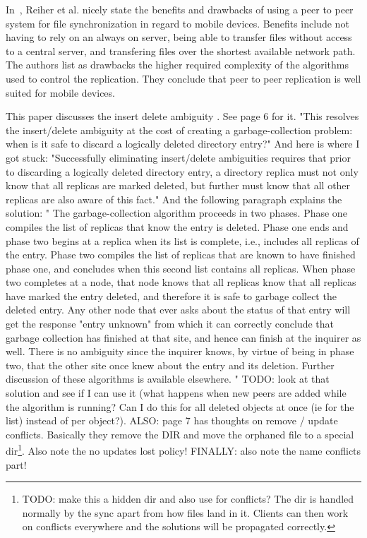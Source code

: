 In~\cite{reiher1996peer}, Reiher et al. nicely state the benefits and drawbacks of using a peer to peer system for file synchronization in regard to mobile devices.
Benefits include not having to rely on an always on server, being able to transfer files without access to a central server, and transfering files over the shortest available network path.
The authors list as drawbacks the higher required complexity of the algorithms used to control the replication.
They conclude that peer to peer replication is well suited for mobile devices.

This paper discusses the insert delete ambiguity \cite{page1998perspectives}.
See page 6 for it.
"This resolves the insert/delete ambiguity at the cost of creating a garbage-collection problem: when is it safe to discard a logically deleted directory entry?"
And here is where I got stuck: "Successfully eliminating insert/delete ambiguities requires that prior to discarding a logically deleted directory entry, a directory replica must not only know that all replicas are marked deleted, but further must know that all other replicas are also aware of this fact."
And the following paragraph explains the solution: "
The garbage-collection algorithm proceeds in two phases.
Phase one compiles the list of replicas that know the entry is deleted.
Phase one ends and phase two begins at a replica when its list is complete, i.e., includes all replicas of the entry.
Phase two compiles the list of replicas that are known to have finished phase one, and concludes when this second list contains all replicas.
When phase two completes at a node, that node knows that all replicas know that all replicas have marked the entry deleted, and therefore it is safe to garbage collect the deleted entry.
Any other node that ever asks about the status of that entry will get the response "entry unknown" from which it can correctly conclude that garbage collection has finished at that site, and hence can finish at the inquirer as well.
There is no ambiguity since the inquirer knows, by virtue of being in phase two, that the other site once knew about the entry and its deletion.
Further discussion of these algorithms is available elsewhere.
"
TODO: look at that solution and see if I can use it (what happens when new peers are added while the algorithm is running? Can I do this for all deleted objects at once (ie for the list) instead of per object?).
ALSO: page 7 has thoughts on remove / update conflicts.
Basically they remove the DIR and move the orphaned file to a special dir\footnote{TODO: make this a hidden dir and also use for conflicts? The dir is handled normally by the sync apart from how files land in it. Clients can then work on conflicts everywhere and the solutions will be propagated correctly.}.
Also note the no updates lost policy!
FINALLY: also note the name conflicts part!

